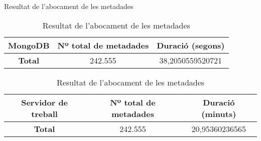 \begin{frame}{Resultat de l'abocament de les metadades}
    \begin{table}[!t]
        \caption{Resultat de l'abocament de les metadades\label{tab:table2}}
        \centering
        \begin{tabular}{|c|c|c|}
            \hline
            MongoDB & Nº total de metadades & Duració (segons)\\
            \hline
            \textbf{Total} & 242.555 & 38,2050559520721\\
            \hline
        \end{tabular}
    \end{table}

    \begin{table}[!t]
        \caption{Resultat de l'abocament de les metadades\label{tab:table3}}
        \centering
        \begin{tabular}{|c|c|c|}
            \hline
            Servidor de treball & Nº total de metadades & Duració (minuts)\\
            \hline
            \textbf{Total} & 242.555 & 20,95360236565\\
            \hline
        \end{tabular}
    \end{table}
\end{frame}